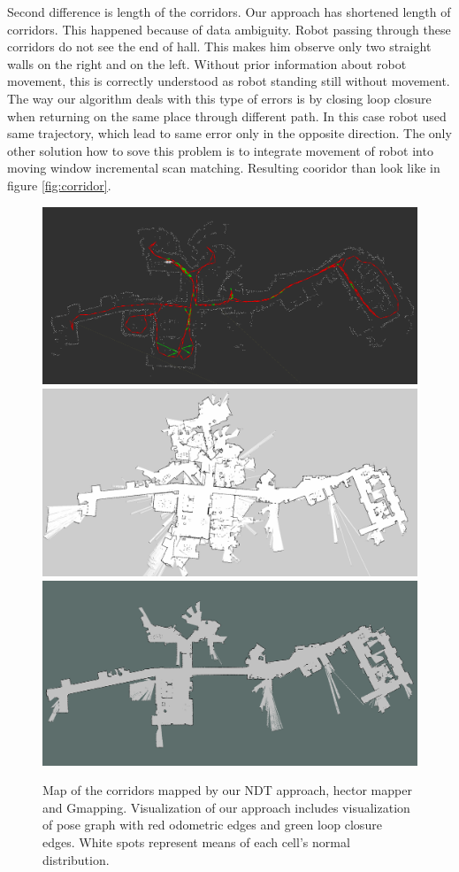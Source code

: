 Second difference is length of the corridors. Our approach has shortened length of corridors. This happened because of data ambiguity. Robot passing through these corridors do not see the end of hall. This makes him observe only two straight walls on the right and on the left. Without prior information about robot movement, this is correctly understood as robot standing still without movement. The way our algorithm deals with this type of errors is by closing loop closure when returning on the same place through different path. In this case robot used same trajectory, which lead to same error only in the opposite direction. The only other solution how to sove this problem is to integrate movement of robot into moving window incremental scan matching. Resulting cooridor than look like in figure \ref{fig:corridor}. 
\begin{figure}
	\centering
	\includegraphics[width=140mm]{../img/full_ndt.png}
	\includegraphics[width=140mm]{../img/full_hector.png}
	\includegraphics[width=140mm]{../img/full_gmapping.png}
	
	\caption{Map of the corridors mapped by our \gls{NDT} approach, hector mapper and Gmapping. Visualization of our approach includes visualization of pose graph with red odometric edges and green loop closure edges. White spots represent means of each cell's  normal distribution.}\label{fig:full_res}
\end{figure}

